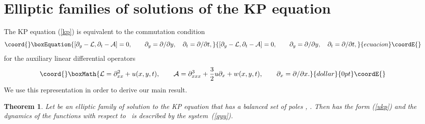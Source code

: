 \documentclass[a4paper,11pt]{article}
\providecommand{\p}{\partial}
\providecommand{\cL}{{\cal L}}
\providecommand{\cA}{{\cal A}}
\theoremstyle{plain}
\newtheorem{teo}{Theorem}
\theoremstyle{remark}
\begin{document}
\section{Elliptic families of solutions of the KP equation}

The KP equation (\ref{kp}) is equivalent to the commutation condition
\begin{equation}\coord{}\boxEquation{\label{lakp}
\left[ \p_y-\cL, \p_t-\cA\right]=0,
\qquad \p_y=\p/\p y,\quad \p_t=\p/\p t,
}{\left[ \p_y-\cL, \p_t-\cA\right]=0,
\qquad \p_y=\p/\p y,\quad \p_t=\p/\p t,
}{ecuacion}\coordE{}\end{equation}
for the auxiliary linear differential operators
$$\coord{}\boxMath{
\cL=\p^2_{xx}+u(x,y,t), \qquad
\cA=\p^3_{xxx}+\frac{3}{2} u \p_x+w(x,y,t),\qquad
\p_x=\p/\p x.
}{dollar}{0pt}\coordE{}$$
We use this representation in order to derive our main result.
\begin{teo}
Let \coordHE{} be an elliptic family of solution to
the KP equation that has a balanced set of poles
\coordHE{}, \coordHE{}.
Then \coordHE{} has the form \emph{(\ref{ukp})} and the dynamics
of the functions \coordHE{} with respect to~\coordHE{} is described by
the system~\emph{(\ref{qyy})}.
\end{teo}
\end{document}
